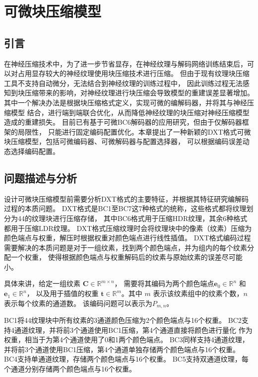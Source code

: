 
\chapter{可微块压缩模型}

\section{引言}

在神经压缩技术中，为了进一步节省显存，在神经纹理与解码网络训练结束后，可以对占用显存较大的神经纹理使用块压缩技术进行压缩。
但由于现有纹理块压缩工具不支持自动微分，无法结合到神经纹理的训练过程中，
因此训练过程无法感知到块压缩带来的影响，对神经纹理进行块压缩会导致模型的重建误差显著增加。
其中一个解决办法是根据块压缩格式定义，实现可微的编解码器，并将其与神经压缩模型
结合，进行端到端联合优化，从而降低神经纹理的块压缩对神经压缩模型造成的重建损失。
目前已有基于可微BC6解码器的应用研究，但由于仅解码器框架的局限性，
只能进行固定编码配置优化。本章提出了一种新颖的DXT格式可微块压缩模型，包括可微编码器、可微解码器与配置选择器，
可以根据编码误差动态选择编码配置。

\section{问题描述与分析}
\label{问题描述}

设计可微块压缩模型前需要分析DXT格式的主要特征，并根据其特征研究编解码过程的本质问题。
DXT格式是BC1至BC7这7种格式的统称，这些格式都将纹理划分为4\times4的纹理块进行压缩存储，
其中BC6格式用于压缩HDR纹理，其余6种格式都用于压缩LDR纹理。
DXT格式压缩纹理时会将纹理块中的像素（纹素）压缩为颜色端点与权重，解压时根据权重对颜色端点进行线性插值。
DXT格式编码过程需要解决的本质问题是对于一组纹素，找到两个颜色端点，并为组内的每个纹素分配一个权重，
使得根据颜色端点与权重解码后的纹素与原始纹素的误差尽可能小。

具体来讲，给定一组纹素 $\mathbf{C}\in\mathbb{R}^{m\times n}$，
需要将其编码为两个颜色端点$\mathbf{e}_0\in\mathbb{R}^n$ 和 $\mathbf{e}_1\in\mathbb{R}^n$，
以及用于插值的权重 $\mathbf{t}\in\mathbb{R}^m$。其中 $m$ 表示该纹素组中的纹素个数，$n$ 表示每个纹素的通道数。
该编码问题可以表示为$P_{m,n}$。

BC1将4\times4纹理块中所有纹素的3通道颜色压缩为2个颜色端点与16个权重。
BC2支持4通道纹理，并将前3个通道使用BC1压缩，第4个通道直接将颜色进行量化
作为权重，相当于为第4个通道使用了0和1两个颜色端点。
BC3同样支持4通道纹理，并将前3个通道使用BC1压缩，第4个通道单独存储两个颜色端点与16个权重。
BC4支持单通道纹理，存储两个颜色端点与16个权重。
BC5支持双通道纹理，每个通道分别存储两个颜色端点与16个权重。

